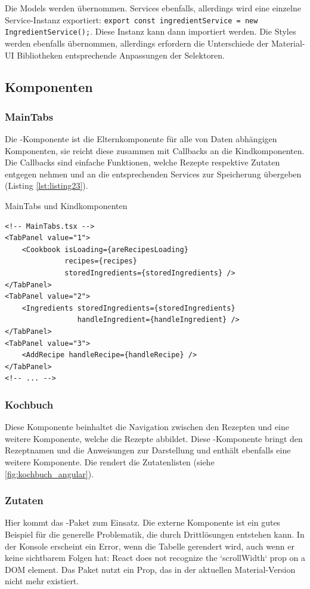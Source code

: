 Die Models werden übernommen. Services ebenfalls, allerdings wird eine einzelne Service-Instanz exportiert: \texttt{export const ingredientService = new IngredientService();}. Diese Instanz kann dann importiert werden. Die Styles werden ebenfalls übernommen, allerdings erfordern die Unterschiede der Material-UI Bibliotheken entsprechende Anpassungen der Selektoren. 

\subsection{Komponenten}

\subsubsection{MainTabs}
Die -Komponente ist die Elternkomponente für alle von Daten abhängigen Komponenten, sie reicht diese zusammen mit Callbacks an die Kindkomponenten. Die Callbacks sind einfache Funktionen, welche Rezepte respektive Zutaten entgegen nehmen und an die entsprechenden Services zur Speicherung übergeben (Listing \ref{lst:listing23}).

\begin{listing}
\caption{MainTabs und Kindkomponenten}
\label{lst:listing23}
\begin{verbatim}
<!-- MainTabs.tsx -->
<TabPanel value="1">
    <Cookbook isLoading={areRecipesLoading} 
              recipes={recipes} 
              storedIngredients={storedIngredients} />
</TabPanel>
<TabPanel value="2">
    <Ingredients storedIngredients={storedIngredients} 
                 handleIngredient={handleIngredient} />
</TabPanel>
<TabPanel value="3">
    <AddRecipe handleRecipe={handleRecipe} />
</TabPanel>
<!-- ... -->
\end{verbatim}
\end{listing}

\subsubsection{Kochbuch}
Diese Komponente beinhaltet die Navigation zwischen den Rezepten und eine weitere Komponente, welche die Rezepte abbildet. Diese -Komponente bringt den Rezeptnamen und die Anweisungen zur Darstellung und enthält ebenfalls eine weitere Komponente. Die  rendert die Zutatenlisten (siehe \ref{fig:kochbuch_angular}).

\subsubsection{Zutaten}
Hier kommt das -Paket zum Einsatz. Die externe Komponente ist ein gutes Beispiel für die generelle Problematik, die durch Drittlösungen entstehen kann. In der Konsole erscheint ein Error, wenn die Tabelle gerendert wird, auch wenn er keine sichtbarem Folgen hat: \glqq React does not recognize the `scrollWidth` prop on a DOM element\grqq . Das Paket nutzt ein Prop, das in der aktuellen Material-Version nicht mehr existiert.

